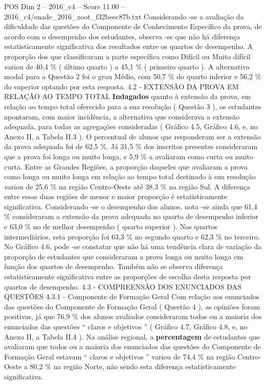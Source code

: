 \begin{textsample}{POS Dim 2 – 2016\_c4 – Score 11.00 – 2016\_c4/enade\_2016\_zoot\_f32beec87b.txt}
Considerando -se a avaliação da dificuldade das questões do Componente de Conhecimento Específico da prova, de acordo com o desempenho dos estudantes, observa -se que não há diferença estatisticamente significativa dos resultados entre os quartos de desempenho.
A proporção dos que classificaram a parte específica como Difícil ou Muito difícil variou de 40,4 \% ( último quarto ) a 45,1 \% ( primeiro quarto ).
A alternativa modal para a Questão 2 foi o grau Médio, com 50,7 \% do quarto inferior e 56,2 \% do superior optando por esta resposta. 4.2 - EXTENSÃO DA PROVA EM RELAÇÃO AO TEMPO TOTAL \textbf{Indagados} quanto à extensão da prova, em relação ao tempo total oferecido para a sua resolução ( Questão 3 ), os estudantes apontaram, com maior incidência, a alternativa que considerava a extensão adequada, para todas as agregações consideradas ( Gráfico 4.5, Gráfico 4.6, e, no Anexo II, a Tabela II.3 ).
O percentual de alunos que responderam ser a extensão da prova adequada foi de 62,5 \%.
Já 31,5 \% dos inscritos presentes consideraram que a prova foi longa ou muito longa, e 5,9 \% a avaliaram como curta ou muito curta.
Entre as Grandes Regiões, a proporção daqueles que avaliaram a prova como longa ou muito longa em relação ao tempo total destinado à sua resolução variou de 25,6 \% na região Centro-Oeste até 38,3 \% na região Sul.
A diferença entre essas duas regiões de menor e maior proporção é estatisticamente significativa.
Considerando -se o desempenho dos alunos, nota -se ainda que 61,4 \% consideraram a extensão da prova adequada no quarto de desempenho inferior e 63,0 \% no de melhor desempenho ( quarto superior ).
Nos quartos intermediários, esta proporção foi 63,3 \% no segundo quarto e 62,3 \% no terceiro.
No Gráfico 4.6, pode -se constatar que não há uma tendência clara de variação da proporção de estudantes que consideraram a prova longa ou muito longa em função dos quartos de desempenho.
Também não se observa diferença estatisticamente significativa entre as proporções de escolha desta resposta por quartos de desempenho. 4.3 - COMPREENSÃO DOS ENUNCIADOS DAS QUESTÕES 4.3.1 - Componente de Formação Geral Com relação aos enunciados das questões do Componente de Formação Geral ( Questão 4 ), as opiniões foram positivas, já que 76,9 \% dos alunos avaliados consideraram todos ou a maioria dos enunciados das questões “ claros e objetivos ” ( Gráfico 4.7, Gráfico 4.8, e, no Anexo II, a Tabela II.4 ).
Na análise regional, a \textbf{percentagem} de estudantes que avaliaram que todos ou a maioria dos enunciados das questões do Componente de Formação Geral estavam “ claros e objetivos ” variou de 74,4 \% na região Centro-Oeste a 80,2 \% na região Norte, não sendo esta diferença estatisticamente significativa.

\end{textsample}
